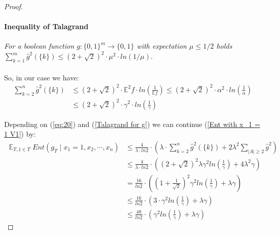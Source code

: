 \documentclass{article}
\begin{document}
\begin{proof}
				\paragraph{Inequality of Talagrand}
					\textit{For a boolean function $g:\{0,1\}^m \rightarrow \{0,1\}$ with expectation $\mu \leq 1/2 $ holds $ \sum_{k=1}^m \hat{g}^2(\{k\}) \leq \left( 2 + \sqrt{2} \right)^2 \cdot \mu^2 \cdot ln(1/\mu).$ }
				
				\paragraph{}
				So, in our case we have: %
				\begin{equation} \begin{aligned} \label{Talagrand for g}
					 \sum_{k=2}^n \hat{g}^2 \left( \{k\} \right) 
					 & \leq \left( 2 + \sqrt{2} \right)^2 \cdot \mathbb{E}^2 f \cdot ln \left( \frac{1}{\mathbb{E} f} \right) 
					 \leq \left( 2 + \sqrt{2} \right)^2 \cdot \alpha^2 \cdot ln \left( \frac{1}{\alpha} \right) \\
					 & \leq \left( 2 + \sqrt{2} \right)^2 \cdot \gamma^2 \cdot ln \left( \frac{1}{\gamma} \right)
				 \end{aligned}
				 \end{equation}
				 
				 Depending on (\ref{eq:20}) and (\ref{Talagrand for g}) we can continue (\ref{Ent with x_1 = 1 V1}) by:				 
				 \begin{equation}\begin{aligned}
					\mathop{\mathbb{E}}_{T,1 \in T} Ent \left( g_T \mid x_1 = 1,x_2, \cdots, x_n \right) 
					& \leq \frac{4}{\lambda \cdot ln 2} \cdot \left( \lambda \cdot \sum_{k=2}^n \hat{g}^2 (\{k\}) + 2 \lambda^2 \sum_{|A| \geq 2} \hat{g}^2  \right) \\
					& \leq \frac{4}{\lambda \cdot ln 2} \cdot \left( \left( 2 + \sqrt{2} \right)^2 \lambda \gamma^2 ln \left( \frac{1}{\gamma} \right) + 4 \lambda^2 \gamma  \right) \\
					& = \frac{16}{ln 2} \cdot \left( \left( 1 + \frac{1}{\sqrt{2}} \right)^2 \gamma^2 ln \left( \frac{1}{\gamma} \right) + \lambda \gamma  \right) \\
					& \leq \frac{16}{ln 2} \cdot \left( 3 \cdot \gamma^2 ln \left( \frac{1}{\gamma} \right) + \lambda \gamma  \right) \\
					& \leq \frac{48}{ln 2} \cdot \left( \gamma^2 ln \left( \frac{1}{\gamma} \right) + \lambda \gamma  \right)
				\end{aligned}
				 \end{equation}
				 \end{proof}
				 
\end{document}
